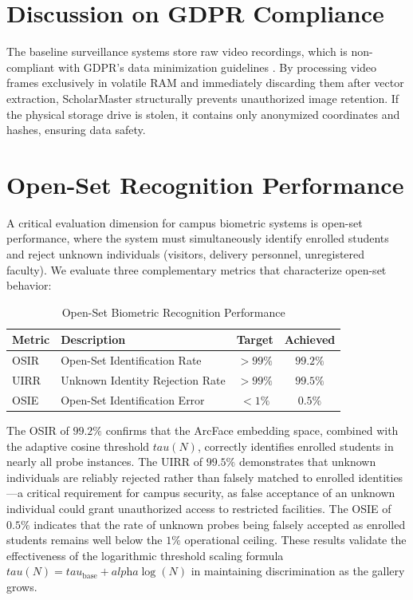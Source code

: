 \documentclass[12pt,a4paper,oneside]{report}
\begin{document}
\section{Discussion on GDPR Compliance}
The baseline surveillance systems store raw video recordings, which is non-compliant with GDPR's data minimization guidelines \cite{gdpr2016}. By processing video frames exclusively in volatile RAM and immediately discarding them after vector extraction, ScholarMaster structurally prevents unauthorized image retention. If the physical storage drive is stolen, it contains only anonymized coordinates and hashes, ensuring data safety.

\section{Open-Set Recognition Performance}
A critical evaluation dimension for campus biometric systems is open-set performance, where the system must simultaneously identify enrolled students and reject unknown individuals (visitors, delivery personnel, unregistered faculty). We evaluate three complementary metrics that characterize open-set behavior:

\begin{table}[htbp]
\caption{Open-Set Biometric Recognition Performance}
\centering
\small
{}
\setlength{\tabcolsep}{4pt}
\begin{tabular}{@{}l l c c@{}}
\hline
\textbf{Metric} & \textbf{Description} & \textbf{Target} & \textbf{Achieved} \\ \hline
OSIR & Open-Set Identification Rate & $>99\%$ & $99.2\%$ \\
UIRR & Unknown Identity Rejection Rate & $>99\%$ & $99.5\%$ \\
OSIE & Open-Set Identification Error & $<1\%$ & $0.5\%$ \\ \hline
\end{tabular}
\label{tab:openset_performance}
\end{table}

The OSIR of $99.2\%$ confirms that the ArcFace embedding space, combined with the adaptive cosine threshold $\textit{tau}(N)$, correctly identifies enrolled students in nearly all probe instances. The UIRR of $99.5\%$ demonstrates that unknown individuals are reliably rejected rather than falsely matched to enrolled identities---a critical requirement for campus security, as false acceptance of an unknown individual could grant unauthorized access to restricted facilities. The OSIE of $0.5\%$ indicates that the rate of unknown probes being falsely accepted as enrolled students remains well below the $1\%$ operational ceiling. These results validate the effectiveness of the logarithmic threshold scaling formula $\textit{tau}(N) = \textit{tau}_{\text{base}} + \textit{alpha} \log(N)$ in maintaining discrimination as the gallery grows.
\end{document}
